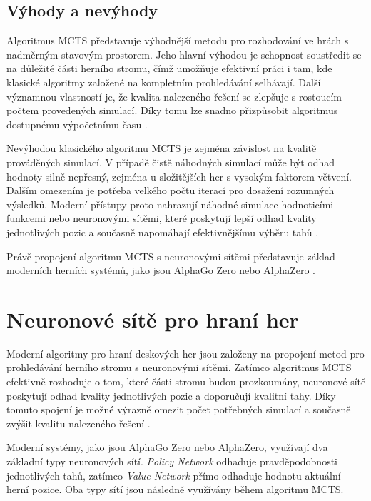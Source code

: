 \subsection{Výhody a nevýhody}

Algoritmus MCTS představuje výhodnější metodu pro rozhodování ve hrách s nadměrným stavovým prostorem. 
Jeho hlavní výhodou je schopnost soustředit se na důležité části herního stromu, 
čímž umožňuje efektivní práci i tam, kde klasické algoritmy založené na kompletním prohledávání selhávají. 
Další významnou vlastností je, že kvalita nalezeného řešení se zlepšuje s rostoucím počtem provedených 
simulací. Díky tomu lze snadno přizpůsobit algoritmus dostupnému výpočetnímu času \cite{browne2012mcts}.

Nevýhodou klasického algoritmu MCTS je zejména závislost na kvalitě prováděných simulací. V případě čistě náhodných 
simulací může být odhad hodnoty silně nepřesný, zejména u složitějších her s vysokým faktorem větvení. Dalším omezením 
je potřeba velkého počtu iterací pro dosažení rozumných výsledků. Moderní přístupy proto nahrazují náhodné simulace 
hodnoticími funkcemi nebo neuronovými sítěmi, které poskytují lepší odhad kvality jednotlivých pozic a současně 
napomáhají efektivnějšímu výběru tahů \cite{browne2012mcts,silver2017alphazero}.

Právě propojení algoritmu MCTS s neuronovými sítěmi představuje základ moderních herních systémů, jako jsou AlphaGo Zero nebo AlphaZero \cite{silver2017alphazero}.

\section{Neuronové sítě pro hraní her}

Moderní algoritmy pro hraní deskových her jsou založeny na propojení metod pro prohledávání herního stromu s neuronovými sítěmi. 
Zatímco algoritmus MCTS efektivně rozhoduje o tom, které části stromu budou prozkoumány, neuronové sítě poskytují odhad kvality 
jednotlivých pozic a doporučují kvalitní tahy. Díky tomuto spojení je možné výrazně omezit počet potřebných simulací a současně 
zvýšit kvalitu nalezeného řešení \cite{silver2017alphazero}.

Moderní systémy, jako jsou AlphaGo Zero nebo AlphaZero, využívají dva základní typy neuronových sítí. \emph{Policy Network} odhaduje 
pravděpodobnosti jednotlivých tahů, zatímco \emph{Value Network} přímo odhaduje hodnotu aktuální herní pozice. Oba typy sítí jsou následně 
využívány během algoritmu MCTS.

